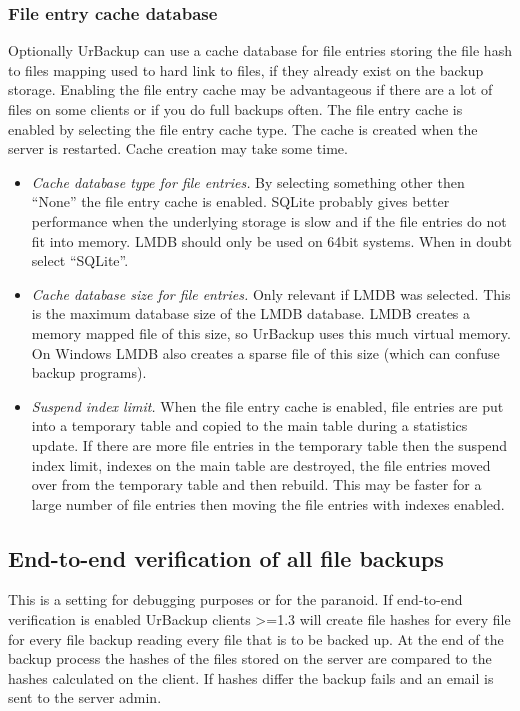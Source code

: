 \documentclass[a4paper,10pt]{article}
\begin{document}
\subsubsection{File entry cache database}

Optionally UrBackup can use a cache database for file entries storing the file hash to files mapping used to
hard link to files, if they already exist on the backup storage. Enabling the file entry cache may be
advantageous if there are a lot of files on some clients or if you do full backups often. The file entry
cache is enabled by selecting the file entry cache type. The cache is created when the server is restarted.
Cache creation may take some time.

\begin{itemize}
  \item \textsl{Cache database type for file entries.} By selecting something other then ``None'' the file
  entry cache is enabled. SQLite probably gives better performance when the underlying storage is slow and
  if the file entries do not fit into memory. LMDB should only be used on 64bit systems. When in doubt select
  ``SQLite''.
  \item \textsl{Cache database size for file entries.} Only relevant if LMDB was selected. This is the maximum
  database size of the LMDB database. LMDB creates a memory mapped file of this size, so UrBackup uses this
  much virtual memory. On Windows LMDB also creates a sparse file of this size (which can confuse backup programs).
  \item \textsl{Suspend index limit.} When the file entry cache is enabled, file entries are put into a temporary
  table and copied to the main table during a statistics update. If there are more file entries in the temporary
  table then the suspend index limit, indexes on the main table are destroyed, the file entries moved over from
  the temporary table and then rebuild. This may be faster for a large number of file entries then moving the file
  entries with indexes enabled.
\end{itemize}

\subsection{End-to-end verification of all file backups}

This is a setting for debugging purposes or for the paranoid. If end-to-end verification is enabled UrBackup clients >=1.3
will create file hashes for every file for every file backup reading every file that is to be backed up. At the end
of the backup process the hashes of the files stored on the server are compared to the hashes calculated on the client.
If hashes differ the backup fails and an email is sent to the server admin.
\end{document}
